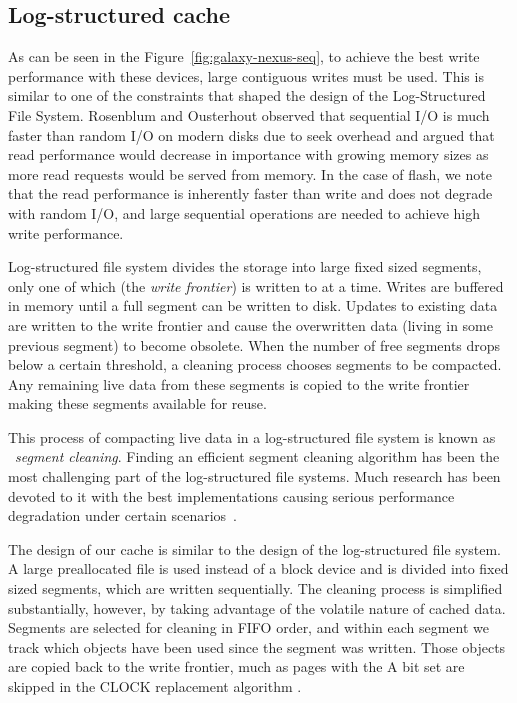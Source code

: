 \documentclass[letterpaper,twocolumn,10pt]{article}
\begin{document}
\subsection{Log-structured cache}
As can be seen in the Figure~\ref{fig:galaxy-nexus-seq}, to achieve the best
write performance with these devices, large contiguous writes must be used.
This is similar to one of the constraints that shaped the design of the
Log-Structured File System.  Rosenblum and Ousterhout observed that sequential
I/O is much faster than random I/O on modern disks due to seek overhead and
argued that read performance would decrease in importance with growing memory
sizes as more read requests would be served from memory.  In the case of flash,
we note that the read performance is inherently faster than write and does not
degrade with random I/O, and large sequential operations are needed to
achieve high write performance.

Log-structured file system divides the storage into large fixed sized segments,
only one of which (the \emph{write frontier}) is written to at a time.  Writes
are buffered in memory until a full segment can be written to disk.  Updates to
existing data are written to the write frontier and cause the overwritten data
(living in some previous segment) to become obsolete.  When the number of free
segments drops below a certain threshold, a cleaning process chooses segments to
be compacted.  Any remaining live data from these segments is copied to the
write frontier making these segments available for reuse.

This process of compacting live data in a log-structured file system is known as
~\emph{segment cleaning}.  Finding an efficient segment cleaning algorithm has
been the most challenging part of the log-structured file systems.  Much
research has been devoted to it with the best implementations causing serious
performance degradation under certain scenarios~\cite{seltzer93}.

The design of our cache is similar to the design of the log-structured file
system.  A large preallocated file is used instead of a block device and is
divided into fixed sized segments, which are written sequentially. The
cleaning process is simplified substantially, however, by taking
advantage of the volatile nature of cached data. Segments are selected
for cleaning in FIFO order, and within each segment we track which
objects have been used since the segment was written. Those objects
are copied back to the write frontier, much as pages with the A bit
set are skipped in the CLOCK replacement algorithm \cite{clock}.
\end{document}
